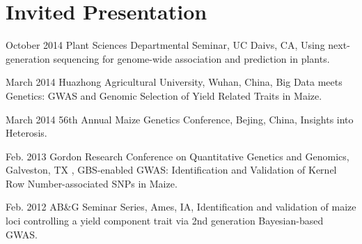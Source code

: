 \documentclass[letterpaper]{article}
\renewenvironment{itemize}{
  \begin{list}{}{
    \setlength{\leftmargin}{1.5em}
  }
}{
  \end{list}
}
\begin{document}
\section*{Invited Presentation}
\begin{itemize}
\item October 2014 Plant Sciences Departmental Seminar, UC Daivs, CA, Using next-generation sequencing for genome-wide association and prediction in plants.

\item March 2014 Huazhong Agricultural University, Wuhan, China, Big Data meets Genetics: GWAS and Genomic Selection of Yield Related Traits in Maize.
\item March 2014 56th Annual Maize Genetics Conference, Bejing, China, Insights into Heterosis.

\item Feb. 2013 Gordon Research Conference on Quantitative Genetics and Genomics, Galveston, TX , GBS-enabled GWAS: Identification and Validation of Kernel Row Number-associated SNPs in Maize.

\item Feb. 2012 AB\&G Seminar Series, Ames, IA, Identification and validation of maize loci controlling a yield component trait via 2nd generation Bayesian-based GWAS.
\end{itemize}

\end{document}
